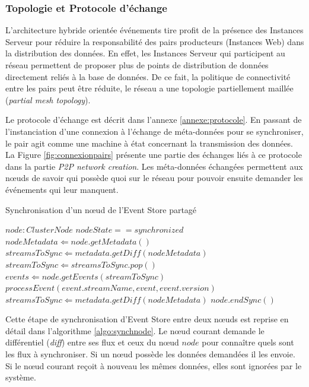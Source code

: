 \subsubsection{Topologie et Protocole d'échange}
L'architecture hybride orientée \og événements\fg{} tire profit de la présence des 
Instances Serveur pour réduire la responsabilité des pairs producteurs (Instances 
Web) dans la distribution des données. En effet, les Instances Serveur qui 
participent au réseau permettent de proposer plus de points de distribution de 
données directement reliés à la base de données. De ce fait, la politique de 
connectivité entre les pairs peut être réduite, le réseau a une topologie 
partiellement maillée (\textit{partial mesh topology}). 

Le protocole d'échange est décrit dans l'annexe \ref{annexe:protocole}. En passant 
de l'instanciation d'une connexion à l'échange de méta-données pour se 
synchroniser, le pair agit comme une machine à état concernant la transmission 
des données. La Figure \ref{fig:connexionpairs} présente une partie des échanges 
liés à ce protocole dans la partie \textit{\gls{P2P} network creation}. Les 
méta-données échangées permettent aux n\oe uds de savoir \og qui possède 
quoi\fg{} sur le réseau pour pouvoir ensuite demander les événements qui leur 
manquent. 


\begin{algorithm} %
	\caption{Synchronisation d'un n\oe ud de l'Event Store partagé} %
	\label{algo:synchnode} %
	\begin{algorithmic} %
		\Require $node : ClusterNode$
		\Ensure $nodeState == synchronized$
		\State $nodeMetadata \Leftarrow node.getMetadata()$
		\State $streamsToSync \Leftarrow metadata.getDiff(nodeMetadata)$
		\State $streamToSync \Leftarrow streamsToSync.pop()$
		\State $events \Leftarrow  node.getEvents(streamToSync)$
		\State $processEvent(event.streamName, event, 
		event.version)$
		\EndFor 
		\EndIf
		\State $streamsToSync \Leftarrow metadata.getDiff(nodeMetadata)$
		\EndWhile
		\EndIf
		\State $node.endSync()$
	\end{algorithmic}
\end{algorithm}

Cette étape de synchronisation d'Event Store entre deux n\oe uds est reprise en 
détail dans l'algorithme \ref{algo:synchnode}. Le n\oe ud courant demande le 
différentiel (\textit{diff}) entre ses flux et ceux du n\oe ud $node$ pour 
connaître quels sont les flux à synchroniser. Si un n\oe ud possède les données 
demandées il les envoie. Si le n\oe ud courant reçoit à nouveau les mêmes 
données, elles sont ignorées par le système.



